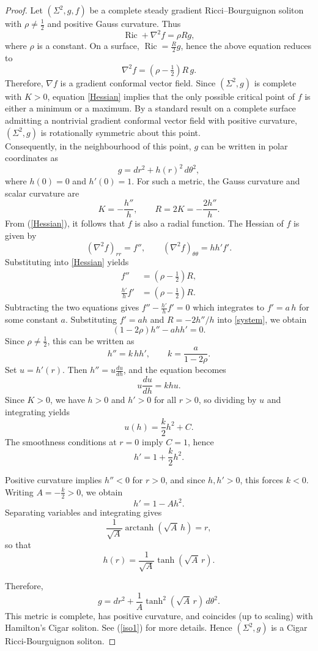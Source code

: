 \documentclass{article}
\theoremstyle{definition}
\theoremstyle{remark}
\begin{document}
\begin{proof}
Let $(\Sigma^2,g,f)$ be a complete steady gradient Ricci--Bourguignon soliton
with $\rho\neq \tfrac12$ and positive Gauss curvature.
Thus
\begin{equation*}\label{RB}
\operatorname{Ric} + \nabla^2 f = \rho R g ,
\end{equation*}
where $\rho$ is a constant.
On a surface, $\operatorname{Ric} = \tfrac{R}{2}g$, hence  the above equation  reduces to
\begin{equation}\label{Hessian}
\nabla^2 f = \left(\rho-\tfrac12\right) R\, g .
\end{equation}
Therefore, $\nabla f$ is a gradient conformal vector field.
Since $(\Sigma^2,g)$ is complete with $K>0$, equation \eqref{Hessian} implies that the only possible critical point of  $f$ is either a minimum or a maximum.
By a standard result \cite{MR174022} on a complete surface admitting a nontrivial gradient 
conformal vector field with positive curvature, $(\Sigma^2,g)$ is rotationally symmetric about this point.\\
Consequently, in the neighbourhood of this point, $g$ can be written in polar coordinates as  
\[
g = dr^2 + h(r)^2\, d\theta^2, 
\]
where $h(0)=0$ and $h'(0)=1$. For such a metric, the Gauss curvature and scalar curvature are
\[
K = -\frac{h''}{h}, \qquad R = 2K = -\frac{2h''}{h}.
\]
From  (\ref{Hessian}), it follows that $f$ is also a radial function.  
The Hessian of $f$ is given by 
\[
(\nabla^2 f)_{rr} = f'', \qquad
(\nabla^2 f)_{\theta\theta} = h h' f'.
\]
Substituting into \eqref{Hessian} yields
\begin{equation}\label{system}
\begin{aligned}
f'' &= \left(\rho-\tfrac12\right) R, \\
\frac{h'}{h} f' &= \left(\rho-\tfrac12\right) R .
\end{aligned}
\end{equation}
Subtracting the two equations gives   $f'' - \frac{h'}{h}f' = 0$
which integrates to  $f' = a\, h$  for some constant $a$.
Substituting $f'=ah$ and $R=-2h''/h$ into \eqref{system}, we obtain
\[
(1-2\rho)h'' - a h h' = 0.
\]
Since $\rho\neq \tfrac12$, this can be written as
\[
h'' = k\, h h', \qquad k =\frac{a}{1-2\rho}.
\]
Set $u=h'(r)$. Then $h'' = u \frac{du}{dh}$, and the equation becomes
\[
u\frac{du}{dh} = k h u.
\]
Since $K>0$, we have $h>0$ and $h'>0$ for all $r>0$, so dividing by $u$ and
integrating yields
\[
u(h) = \frac{k}{2}h^2 + C.
\]
The smoothness conditions at $r=0$ imply $C=1$, hence
\[
h' = 1 + \frac{k}{2}h^2.
\]

Positive curvature implies $h''<0$ for $r>0$, and since $h,h'>0$, this forces
$k<0$. Writing $A =-\frac{k}{2}>0$, we obtain
\[
h' = 1 - A h^2.
\]
Separating variables and integrating gives
\[
\frac{1}{\sqrt A}\operatorname{arctanh}(\sqrt A\, h)= r,
\]
so that
\[
h(r)=\frac{1}{\sqrt A}\tanh(\sqrt A\, r).
\]

Therefore,
\[
g = dr^2 + \frac{1}{A}\tanh^2(\sqrt A\, r)\, d\theta^2.
\]
This metric is complete, has positive curvature, and coincides (up to scaling)
with Hamilton’s Cigar soliton. See  (\ref{iso1}) for more details.
Hence $(\Sigma^2,g)$ is a Cigar Ricci-Bourguignon soliton.
\end{proof}
\end{document}

